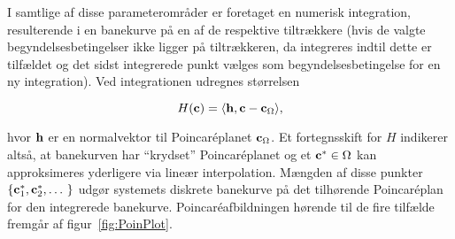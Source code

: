 I samtlige af disse parameteromr{\aa}der er foretaget en
numerisk integration, resulterende i en banekurve p{\aa} en
af de respektive tiltr{\ae}kkere (hvis de valgte
begyndelsesbetingelser ikke ligger p{\aa} tiltr{\ae}kkeren, da
integreres indtil dette er tilf{\ae}ldet og det sidst
integrerede punkt v{\ae}lges som begyndelsesbetingelse for en
ny integration). Ved integrationen udregnes st{\o}rrelsen


\begin{equation}
  H({\bf c}) = \langle {\bf h},{\bf c}-{\bf c}_{\Omega} \rangle,
  \label{eq:PoincareSign}
\end{equation}

hvor ${\bf h}$ er en normalvektor til Poincar\'{e}planet
${\bf c}_\Omega$. Et fortegnsskift for $H$ indikerer
alts{\aa}, at banekurven har ``krydset'' Poincar\'{e}planet
og et ${\bf c}^*\in\Omega$ kan approksimeres yderligere via
line{\ae}r interpolation. M{\ae}ngden af disse punkter $\{
{\bf c}^*_1, {\bf c}^*_2, \ldots\ \}$ udg{\o}r systemets
diskrete banekurve p{\aa} det tilh{\o}rende
Poincar\'{e}\-plan for den integrerede banekurve.
Poincar\'{e}afbild\-ningen h{\o}rende til de fire
tilf{\ae}lde fremg{\aa}r af figur~\ref{fig:PoinPlot}.

